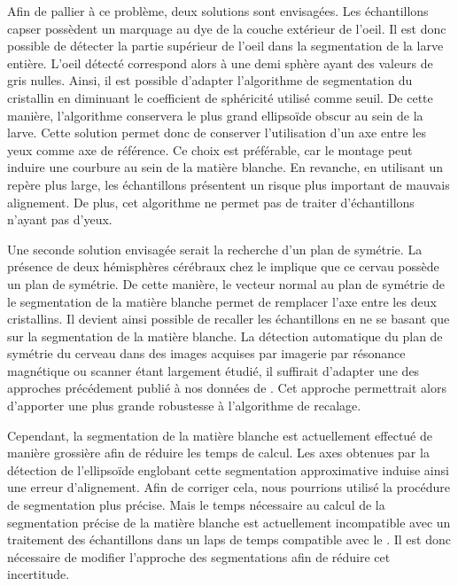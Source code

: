 \documentclass[\main/main.tex]{subfiles}
\begin{document}
Afin de pallier à ce problème, deux solutions sont envisagées.
%
Les échantillons capser possèdent un marquage au dye de la couche extérieur de l'oeil.
%
Il est donc possible de détecter la partie supérieur de l'oeil dans la segmentation de la larve entière.
%
L'oeil détecté correspond alors à une demi sphère ayant des valeurs de gris nulles.
%
Ainsi, il est possible d'adapter l'algorithme de segmentation du cristallin en diminuant le coefficient de sphéricité utilisé comme seuil.
%
De cette manière, l'algorithme conservera le plus grand ellipsoïde obscur au sein de la larve.
%
Cette solution permet donc de conserver l'utilisation d'un axe entre les yeux comme axe de référence.
%
Ce choix est préférable, car le montage peut induire une courbure au sein de la matière blanche.
%
En revanche, en utilisant un repère plus large, les échantillons présentent un risque plus important de mauvais alignement.
%
De plus, cet algorithme ne permet pas de traiter d'échantillons n'ayant pas d'yeux.

Une seconde solution envisagée serait la recherche d'un plan de symétrie.
%
La présence de deux hémisphères cérébraux chez le \pz implique que ce cervau possède un plan de symétrie.
%
De cette manière, le vecteur normal au plan de symétrie de le segmentation de la matière blanche permet de remplacer l'axe entre les deux cristallins.
%
Il devient ainsi possible de recaller les échantillons en ne se basant que sur la segmentation de la matière blanche.
%
La détection automatique du plan de symétrie du cerveau dans des images acquises par imagerie par résonance magnétique ou scanner étant largement étudié\cite{tan_2019,noori_2020,rehman_2018},
il suffirait d'adapter une des approches précédement publié à nos données de \pz{}.
%
Cet approche permettrait alors d'apporter une plus grande robustesse à l'algorithme de recalage.

%
Cependant, la segmentation de la matière blanche est actuellement effectué de manière grossière afin de réduire les temps de calcul.
%
Les axes obtenues par la détection de l'ellipsoïde englobant cette segmentation approximative induise ainsi une erreur d'alignement.
%
Afin de corriger cela, nous pourrions utilisé la procédure de segmentation plus précise.
%
Mais le temps nécessaire au calcul de la segmentation précise de la matière blanche est actuellement incompatible avec un traitement des échantillons dans un laps de temps compatible avec le \hcs{}.
%
Il est donc nécessaire de modifier l'approche des segmentations afin de réduire cet incertitude.
\end{document}
